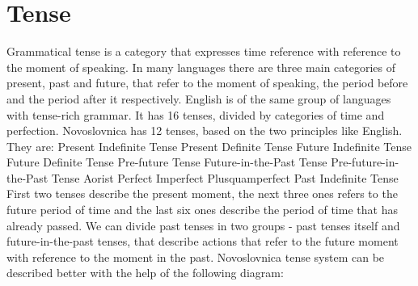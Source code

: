 \section{Tense}

Grammatical tense is a category that expresses time reference with reference to the moment of speaking. In many languages there are three main categories of present, past and future, that refer to the moment of speaking, the period before and the period after it respectively. English is of the same group of languages with tense-rich grammar. It has 16 tenses, divided by categories of time and perfection. Novoslovnica has 12 tenses, based on the two principles like English. They are:
Present Indefinite Tense
Present Definite Tense
Future Indefinite Tense
Future Definite Tense
Pre-future Tense
Future-in-the-Past Tense
Pre-future-in-the-Past Tense
Aorist
Perfect
Imperfect
Plusquamperfect
Past Indefinite Tense
First two tenses describe the present moment, the next three ones refers to the future period of time and the last six ones describe the period of time that has already passed.
We can divide past tenses in two groups - past tenses itself and future-in-the-past tenses, that describe actions that refer to the future moment with reference to the moment in the past.
Novoslovnica tense system can be described better with the help of the following diagram:


